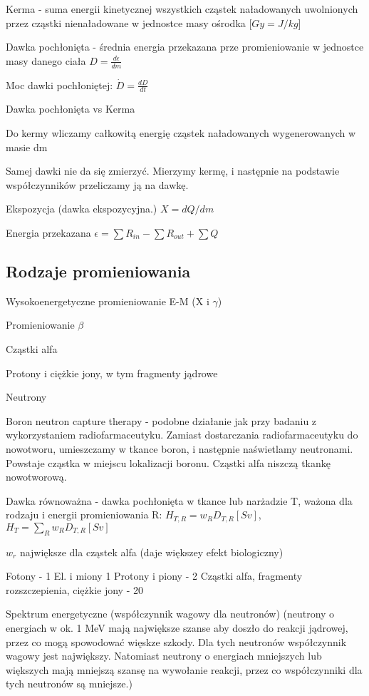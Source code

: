 \documentclass{article}
\begin{document}
Kerma - suma energii kinetycznej wszystkich cząstek naładowanych uwolnionych przez cząstki nienaładowane w jednostce masy ośrodka [$Gy = J/kg$]

Dawka pochłonięta - średnia energia przekazana prze promieniowanie w jednostce masy danego ciała $D = \frac{d\epsilon}{dm}$

Moc dawki pochłoniętej: $\dot{D} = \frac{dD}{dt}$

Dawka pochłonięta vs Kerma

Do kermy wliczamy całkowitą energię cząstek naładowanych wygenerowanych w masie dm

Samej dawki nie da się zmierzyć. Mierzymy kermę, i następnie na podstawie współczynników przeliczamy ją na dawkę.

Ekspozycja (dawka ekspozycyjna.) $X = dQ / dm$

Energia przekazana $\epsilon = \sum R_{in} - \sum R_{out} + \sum Q$

\subsection{Rodzaje promieniowania}

Wysokoenergetyczne promieniowanie E-M (X i $\gamma$)

Promieniowanie $\beta$

Cząstki alfa

Protony i ciężkie jony, w tym fragmenty jądrowe

Neutrony

Boron neutron capture therapy - podobne działanie jak przy badaniu z wykorzystaniem radiofarmaceutyku. Zamiast dostarczania radiofarmaceutyku do nowotworu, umieszczamy w tkance boron, i następnie naświetlamy neutronami. Powstaje cząstka w miejscu lokalizacji boronu. Cząstki alfa niszczą tkankę nowotworową.

Dawka równoważna - dawka pochłonięta w tkance lub narżadzie T, ważona dla rodzaju i energii promieniowania R: $H_{T,R} = w_RD_{T,R} [Sv]$, $H_{T} = \sum_{R} w_RD_{T,R} [Sv]$

$w_r$ największe dla cząstek alfa (daje większey efekt biologiczny)

Fotony - 1
El. i miony 1
Protony i piony - 2
Cząstki alfa, fragmenty rozszczepienia, ciężkie jony - 20

Spektrum energetyczne (współczynnik wagowy dla neutronów) (neutrony o energiach w ok. 1 MeV mają największe szanse aby doszło do reakcji jądrowej, przez co mogą spowodować więskze szkody. Dla tych neutronów współczynnik wagowy jest największy. Natomiast neutrony o energiach mniejszych lub większych mają mniejszą szansę na wywołanie reakcji, przez co współczynniki dla tych neutronów są mniejsze.)
\end{document}
